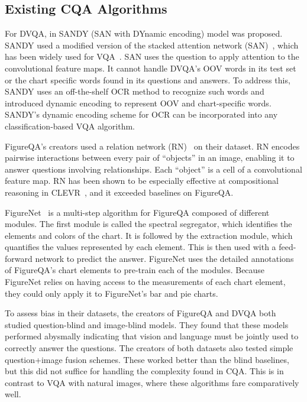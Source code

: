 \documentclass[10pt,twocolumn]{article}
\begin{document}
\subsection{Existing CQA Algorithms}\label{sec:algorithms}

For DVQA, in \cite{kafle2018dvqa} SANDY (SAN with DYnamic encoding) model was proposed. SANDY used a modified version of the stacked attention network (SAN)~\cite{Yang2016,kazemi2017show}, which has been widely used for VQA~\cite{kazemi2017show,anderson2018bottom}. SAN uses the question to apply attention to the convolutional feature maps. It cannot handle DVQA's OOV words in its test set or the chart specific words found in its questions and answers. To address this, SANDY uses an off-the-shelf OCR method to recognize such words and introduced dynamic encoding to represent OOV and chart-specific words. SANDY's dynamic encoding scheme for OCR can be incorporated into any classification-based VQA algorithm. 


FigureQA's creators used a relation network (RN)~\cite{santoro2017simple} on their dataset.  RN encodes pairwise interactions between every pair of ``objects'' in an image, enabling it to answer questions involving relationships. Each ``object'' is a cell of a convolutional feature map. RN has been shown to be especially effective at compositional reasoning in CLEVR~\cite{santoro2017simple}, and it exceeded baselines on FigureQA.

FigureNet~\cite{reddy2018question} is a multi-step algorithm for FigureQA composed of different modules. The first module is called the spectral segregator, which identifies the elements and colors of the chart. It is followed by the extraction module, which  quantifies the values represented by each element. This is then used with a feed-forward network to predict the answer. FigureNet uses the detailed annotations of FigureQA's chart elements to pre-train each of the modules. Because FigureNet relies on having access to the measurements of each chart element, they could only apply it to FigureNet's bar and pie charts.

To assess bias in their datasets, the creators of  FigureQA and DVQA both studied question-blind and image-blind models. They found that these models performed abysmally indicating that vision and language must be jointly used to correctly answer the questions. The creators of both datasets also tested simple question+image fusion schemes. These  worked better than the blind baselines, but this did not suffice for handling the complexity found in CQA. This is in contrast to VQA with natural images, where these algorithms fare comparatively well.
\end{document}
